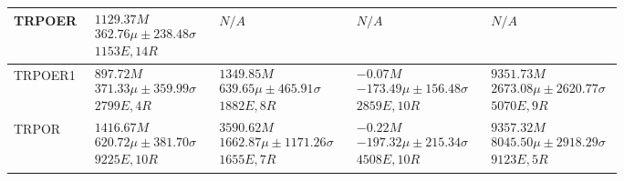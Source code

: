 \begin{tabular}{|l|p{3.2cm}|p{3.2cm}|p{3.2cm}|p{3.2cm}|}
TRPOER & $\begin{array}{c} 1129.37M \\ 362.76\mu \pm 238.48\sigma \\ 1153E, 14R \end{array}$ & $\begin{array}{c} N/A \end{array}$ & $\begin{array}{c} N/A \end{array}$ & $\begin{array}{c} N/A \end{array}$ \\  \hline
TRPOER1 & $\begin{array}{c} 897.72M \\ 371.33\mu \pm 359.99\sigma \\ 2799E, 4R \end{array}$ & $\begin{array}{c} 1349.85M \\ 639.65\mu \pm 465.91\sigma \\ 1882E, 8R \end{array}$ & $\begin{array}{c} -0.07M \\ -173.49\mu \pm 156.48\sigma \\ 2859E, 10R \end{array}$ & $\begin{array}{c} 9351.73M \\ 2673.08\mu \pm 2620.77\sigma \\ 5070E, 9R \end{array}$ \\  \hline
TRPOR & $\begin{array}{c} 1416.67M \\ 620.72\mu \pm 381.70\sigma \\ 9225E, 10R \end{array}$ & $\begin{array}{c} 3590.62M \\ 1662.87\mu \pm 1171.26\sigma \\ 1655E, 7R \end{array}$ & $\begin{array}{c} -0.22M \\ -197.32\mu \pm 215.34\sigma \\ 4508E, 10R \end{array}$ & $\begin{array}{c} 9357.32M \\ 8045.50\mu \pm 2918.29\sigma \\ 9123E, 5R \end{array}$ \\  \hline
\bottomrule  \hline
\end{tabular}
